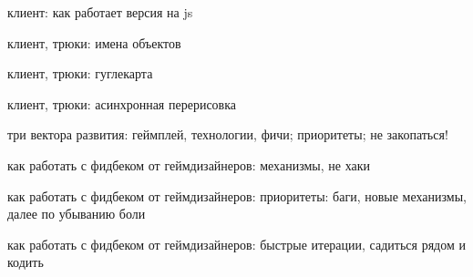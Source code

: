 \documentclass[aspectratio=169,handout,bigger]{beamer}
\begin{document}

\begin{frame}{клиент: как работает версия на js}
\end{frame}


\begin{frame}{клиент, трюки: имена объектов}
\end{frame}


\begin{frame}{клиент, трюки: гуглекарта}
\end{frame}


\begin{frame}{клиент, трюки: асинхронная перерисовка}
\end{frame}


\begin{frame}{три вектора развития: геймплей, технологии, фичи; приоритеты; не закопаться!}
\end{frame}


\begin{frame}{как работать с фидбеком от геймдизайнеров: механизмы, не хаки}
\end{frame}


\begin{frame}{как работать с фидбеком от геймдизайнеров: приоритеты: баги, новые механизмы, далее по убыванию боли}
\end{frame}


\begin{frame}{как работать с фидбеком от геймдизайнеров: быстрые итерации, садиться рядом и кодить}
\end{frame}
\end{document}
